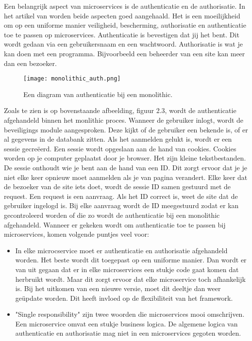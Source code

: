 Een belangrijk aspect van microservices is de authenticatie en de authorisatie. In het artikel van  \textcite{Ayoub2018} worden beide aspecten goed aangehaald. Het is een moeilijkheid om op een uniforme manier veiligheid, bescherming, authorisatie en authenticatie toe te passen op microservices. Authenticatie is bevestigen dat jij het bent. Dit wordt gedaan via een gebruikersnaam en een wachtwoord. Authorisatie is wat je kan doen met een programma. Bijvoorbeeld een beheerder van een site kan meer dan een bezoeker. 
\begin{figure}[h]
	\texttt{[image: monolithic\_auth.png]}
	\centering
	\caption{Een diagram van authenticatie bij een monolithic. \textcite{Ayoub2018}}
\end{figure}
Zoals te zien is op bovenstaande afbeelding, figuur 2.3, wordt de authenticatie afgehandeld binnen het monlithic proces. Wanneer de gebruiker inlogt, wordt de beveiligings module aangesproken. Deze kijkt of de gebruiker een bekende is, of er al gegevens in de databank zitten. Als het aanmelden gelukt is, wordt er een sessie gecreëerd. Een sessie wordt opgeslaan aan de hand van cookies. Cookies worden op je computer geplaatst door je browser. Het zijn kleine tekstbestanden. De sessie onthoudt wie je bent aan de hand van een ID. Dit zorgt ervoor dat je je niet elke keer opnieuw moet aanmelden als je van pagina verandert.  Elke keer dat de bezoeker van de site iets doet, wordt de sessie ID samen gestuurd met de request. Een request is een aanvraag. Als het ID correct is, weet de site dat de gebruiker ingelogd is. Bij elke aanvraag wordt de ID meegestuurd zodat er kan gecontroleerd worden of die zo wordt de authenticatie bij een monolithic afgehandeld.
Wanneer er gekeken wordt om authenticatie toe te passen bij microservices, komen volgende puntjes veel voor:
\begin{itemize}
	\item In elke microcservice moet er authenticatie en authorisatie afgehandeld worden. Het beste wordt dit toegepast op een uniforme manier. Dan wordt er van uit gegaan dat er in elke microservices een stukje code gaat komen dat herbruikt wordt. Maar dit zorgt ervoor dat elke microservice toch afhankelijk is. Bij het uitkomen van een nieuwe versie, moet dit deeltje dan weer geüpdate worden. Dit heeft invloed op de flexibiliteit van het framework.
	\item "Single responsibility" zijn twee woorden die microservices mooi omschrijven. Een microservice omvat een stukje business logica. De algemene logica van authenticatie en authorisatie mag niet in een microservices gegoten worden. 
\end{itemize}
